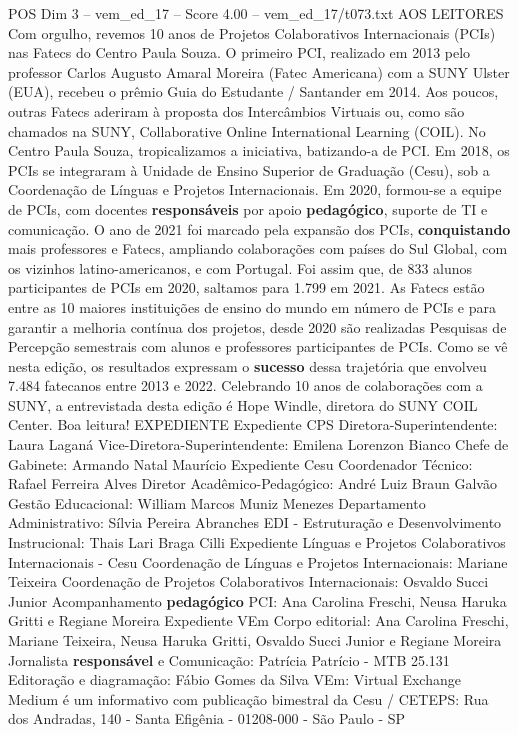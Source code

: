 \begin{textsample}{POS Dim 3 – vem\_ed\_17 – Score 4.00 – vem\_ed\_17/t073.txt}  \label{ex:f3_pos_175}
AOS LEITORES Com orgulho, revemos 10 anos de Projetos Colaborativos Internacionais (PCIs) nas Fatecs do Centro Paula Souza.
O primeiro PCI, realizado em 2013 pelo professor Carlos Augusto Amaral Moreira (Fatec Americana) com a SUNY Ulster (EUA), recebeu o prêmio Guia do Estudante / Santander em 2014.
Aos poucos, outras Fatecs aderiram à proposta dos Intercâmbios Virtuais ou, como são chamados na SUNY, Collaborative Online International Learning (COIL).
No Centro Paula Souza, tropicalizamos a iniciativa, batizando-a de PCI.
Em 2018, os PCIs se integraram à Unidade de Ensino Superior de Graduação (Cesu), sob a Coordenação de Línguas e Projetos Internacionais.
Em 2020, formou-se a equipe de PCIs, com docentes \textbf{responsáveis} por apoio \textbf{pedagógico}, suporte de TI e comunicação.
O ano de 2021 foi marcado pela expansão dos PCIs, \textbf{conquistando} mais professores e Fatecs, ampliando colaborações com países do Sul Global, com os vizinhos latino-americanos, e com Portugal.
Foi assim que, de 833 alunos participantes de PCIs em 2020, saltamos para 1.799 em 2021.
As Fatecs estão entre as 10 maiores instituições de ensino do mundo em número de PCIs e para garantir a melhoria contínua dos projetos, desde 2020 são realizadas Pesquisas de Percepção semestrais com alunos e professores participantes de PCIs.
Como se vê nesta edição, os resultados expressam o \textbf{sucesso} dessa trajetória que envolveu 7.484 fatecanos entre 2013 e 2022.
Celebrando 10 anos de colaborações com a SUNY, a entrevistada desta edição é Hope Windle, diretora do SUNY COIL Center.
Boa leitura!
EXPEDIENTE Expediente CPS Diretora-Superintendente: Laura Laganá Vice-Diretora-Superintendente: Emilena Lorenzon Bianco Chefe de Gabinete: Armando Natal Maurício Expediente Cesu Coordenador Técnico: Rafael Ferreira Alves Diretor Acadêmico-Pedagógico: André Luiz Braun Galvão Gestão Educacional: William Marcos Muniz Menezes Departamento Administrativo: Sílvia Pereira Abranches EDI - Estruturação e Desenvolvimento Instrucional: Thais Lari Braga Cilli Expediente Línguas e Projetos Colaborativos Internacionais - Cesu Coordenação de Línguas e Projetos Internacionais: Mariane Teixeira Coordenação de Projetos Colaborativos Internacionais: Osvaldo Succi Junior Acompanhamento \textbf{pedagógico} PCI: Ana Carolina Freschi, Neusa Haruka Gritti e Regiane Moreira Expediente VEm Corpo editorial: Ana Carolina Freschi, Mariane Teixeira, Neusa Haruka Gritti, Osvaldo Succi Junior e Regiane Moreira Jornalista \textbf{responsável} e Comunicação: Patrícia Patrício - MTB 25.131 Editoração e diagramação: Fábio Gomes da Silva VEm: Virtual Exchange Medium é um informativo com publicação bimestral da Cesu / CETEPS: Rua dos Andradas, 140 - Santa Efigênia - 01208-000 - São Paulo - SP

\end{textsample}
